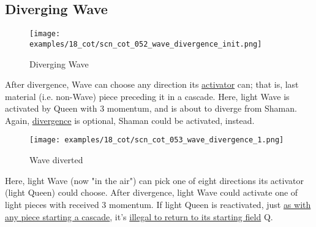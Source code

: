\subsection*{Diverging Wave}
\label{sec:Conquest of Tlalocan/Divergence/Diverging Wave}

\vspace*{-1.4\baselineskip}
\noindent
\begin{figure}[!h]
\texttt{[image: examples/18\_cot/scn\_cot\_052\_wave\_divergence\_init.png]}
\vspace*{-1.3\baselineskip}
\caption{Diverging Wave}
\label{fig:scn_cot_052_wave_divergence_init}
\end{figure}

\vspace*{-0.4\baselineskip}
After divergence, Wave can choose any direction its
\hyperref[fig:scn_mv_32_wave_cascading_steps]{activator} can; that is, last material
(i.e. non-Wave) piece preceding it in a cascade.\newline
\indent
Here, light Wave is activated by Queen with 3 momentum, and is about to diverge from
Shaman.\newline
\indent
Again, \hyperref[fig:scn_cot_030_own_shaman_is_divergent_init]{divergence} is optional,
Shaman could be activated, instead.

\clearpage %

\vspace*{-2.1\baselineskip}
\noindent
\begin{figure}[!h]
\texttt{[image: examples/18\_cot/scn\_cot\_053\_wave\_divergence\_1.png]}
\vspace*{-1.3\baselineskip}
\caption{Wave diverted}
\label{fig:scn_cot_053_wave_divergence_1}
\end{figure}

\vspace*{-0.4\baselineskip}
Here, light Wave (now "in the air") can pick one of eight directions its activator
(light Queen) could choose. After divergence, light Wave could activate one of light
pieces with received 3 momentum. If light Queen is reactivated, just
\hyperref[fig:scn_mv_53_static_move_is_illegal_init]{as with any piece starting a cascade}, it's
\hyperref[fig:scn_cot_031_own_shaman_is_divergent_end]{illegal to return to its starting field} Q.

\clearpage %

